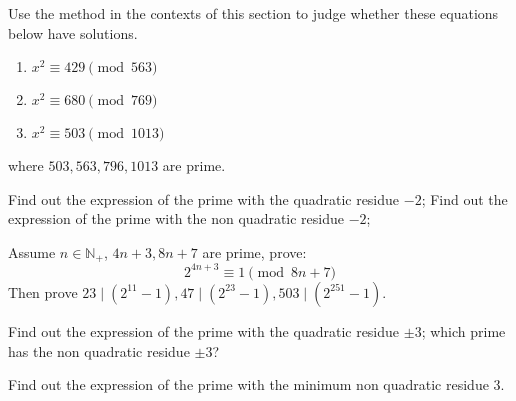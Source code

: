 \documentclass{ctexart}
\newif\ifpreface
\begin{document}
\large
\setlength{\baselineskip}{1.2em}
\ifpreface

\else
{}
\begin{problem}\label{pro:1}
  Use the method in the contexts of this section to judge whether these equations below have solutions.
  \begin{enumerate}
    \item \(x^2 \equiv 429 \pmod{563}\)
    \item \(x^2 \equiv 680 \pmod{769}\)
    \item \(x^2 \equiv 503 \pmod{1013}\)
  \end{enumerate}
  where \(503,563,796,1013\) are prime.
\end{problem}
\begin{problem}\label{pro:2}
  Find out the expression of the prime with the quadratic residue \(-2\);
  Find out the expression of the prime with the non quadratic residue \(-2\);
\end{problem}
\begin{problem}\label{pro:3}
  Assume \(n \in \mathbb{N}_+\), \(4n + 3,8n + 7\) are prime, prove:
  \[
    2^{4n + 3}\equiv 1 \pmod{8n + 7}
  \]
  Then prove \(23 \mid(2^{11}-1),47 \mid (2^{23}-1),503 \mid (2^{251}-1)\).
\end{problem}
\begin{problem}\label{pro:4}
  Find out the expression of the prime with the quadratic residue \(\pm 3\);
  which prime has the non quadratic residue \(\pm 3\)?
\end{problem}
\begin{problem}\label{pro:5}
  Find out the expression of the prime with the minimum non quadratic residue \( 3\).
\end{problem}
\end{document}
